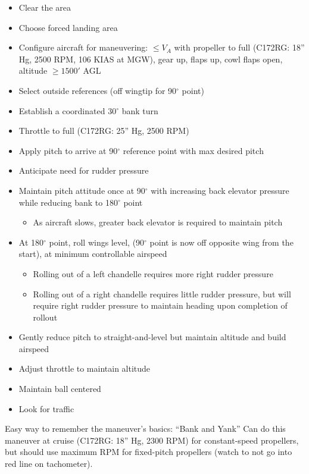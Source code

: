 \begin{itemize}
  \item Clear the area
  \item Choose forced landing area
  \item Configure aircraft for maneuvering: $\leq V_A$ with propeller to full
    (C172RG: 18'' Hg, 2500 RPM, 106 KIAS at MGW), gear up, flaps up, cowl flaps
    open, altitude $\geq 1500'$ AGL
  \item Select outside references (off wingtip for 90$^\circ$ point) 
  \item Establish a coordinated 30$^\circ$ bank turn
  \item Throttle to full (C172RG: 25'' Hg, 2500 RPM)
  \item Apply pitch to arrive at 90$^\circ$ reference point with max desired
    pitch
  \item Anticipate need for rudder pressure
  \item Maintain pitch attitude once at 90$^\circ$ with increasing back elevator
    pressure while reducing bank to 180$^\circ$ point
    \begin{itemize}
      \item As aircraft slows, greater back elevator is required to maintain
        pitch
    \end{itemize}
  \item At 180$^\circ$ point, roll wings level, (90$^\circ$ point is now off
    opposite wing from the start), at minimum controllable airspeed
    \begin{itemize}
      \item Rolling out of a left chandelle requires more right rudder pressure
      \item Rolling out of a right chandelle requires little rudder pressure,
        but will require right rudder pressure to maintain heading upon
        completion of rollout
    \end{itemize}
  \item Gently reduce pitch to straight-and-level but maintain altitude and
    build airspeed
  \item Adjust throttle to maintain altitude
  \item Maintain ball centered
  \item Look for traffic
\end{itemize}

Easy way to remember the maneuver's basics: ``Bank and Yank'' Can do this
maneuver at cruise (C172RG: 18'' Hg, 2300 RPM) for constant-speed propellers,
but should use maximum RPM for fixed-pitch propellers (watch to not go into red
line on tachometer).

